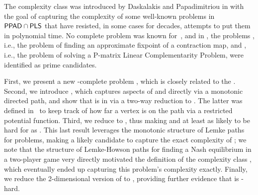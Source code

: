 The complexity class \CLS was introduced by Daskalakis and Papadimitriou in \cite{daskalakis2011continuous} with the goal of capturing the complexity of some well-known problems in $\mathsf{PPAD} \cap \mathsf{PLS}$ that have resisted, in some cases for decades, attempts to put them in polynomial time.  No complete problem was known for~\CLS, and in \cite{daskalakis2011continuous}, the problems \CM, i.e., the problem of finding an approximate fixpoint of a contraction map, and \PLCP, i.e., the problem of solving a P-matrix Linear Complementarity Problem, were identified as prime candidates. 

First, we present a new \CLS-complete problem \MMCM, which is closely related to the \CM. Second, we introduce \EOPL, which captures aspects of \PPAD and \PLS directly via a monotonic directed path, and show that \EOPL is in \CLS via a two-way reduction to \EOML. The latter was defined in~\cite{hubavcek2017hardness} to keep track of how far a vertex is on the \PPAD path via a restricted potential function.  Third, we reduce \PLCP to \EOPL, thus making \EOPL and \EOML at least as likely to be hard for \CLS as \PLCP. This last result leverages the monotonic structure of Lemke paths for \PLCP problems, making \EOPL a likely candidate to capture the exact complexity of \PLCP; we note that the structure of Lemke-Howson paths for finding a Nash equilibrium in a two-player game very directly motivated the definition of the complexity class \PPAD, which eventually ended up capturing this problem's complexity exactly. Finally, we reduce the 2-dimensional version of \CM to \EOPL, providing further evidence that \EOPL is \CLS-hard.
